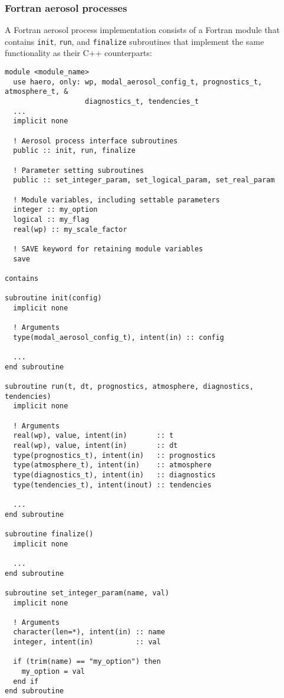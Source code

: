 \subsubsection{Fortran aerosol processes}

A Fortran aerosol process implementation consists of a Fortran module that
contains \texttt{init}, \texttt{run}, and \texttt{finalize} subroutines that
implement the same functionality as their C++ counterparts:

\begin{lstlisting}
module <module_name>
  use haero, only: wp, modal_aerosol_config_t, prognostics_t, atmosphere_t, &
                   diagnostics_t, tendencies_t
  ...
  implicit none

  ! Aerosol process interface subroutines
  public :: init, run, finalize

  ! Parameter setting subroutines
  public :: set_integer_param, set_logical_param, set_real_param

  ! Module variables, including settable parameters
  integer :: my_option
  logical :: my_flag
  real(wp) :: my_scale_factor

  ! SAVE keyword for retaining module variables
  save

contains

subroutine init(config)
  implicit none

  ! Arguments
  type(modal_aerosol_config_t), intent(in) :: config

  ...
end subroutine

subroutine run(t, dt, prognostics, atmosphere, diagnostics, tendencies)
  implicit none

  ! Arguments
  real(wp), value, intent(in)       :: t
  real(wp), value, intent(in)       :: dt
  type(prognostics_t), intent(in)   :: prognostics
  type(atmosphere_t), intent(in)    :: atmosphere
  type(diagnostics_t), intent(in)   :: diagnostics
  type(tendencies_t), intent(inout) :: tendencies

  ...
end subroutine

subroutine finalize()
  implicit none

  ...
end subroutine

subroutine set_integer_param(name, val)
  implicit none

  ! Arguments
  character(len=*), intent(in) :: name
  integer, intent(in)          :: val

  if (trim(name) == "my_option") then
    my_option = val
  end if
end subroutine


\end{lstlisting}
